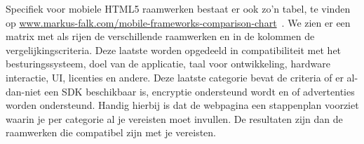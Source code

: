 Specifiek voor mobiele HTML5 raamwerken bestaat er ook zo'n tabel,  te vinden op \url{www.markus-falk.com/mobile-frameworks-comparison-chart}~\cite{Falk2011}.  We zien er een matrix met als rijen de verschillende raamwerken en in de kolommen de vergelijkingscriteria.  Deze laatste worden opgedeeld in compatibiliteit met het besturingssysteem,  doel van de applicatie,  taal voor ontwikkeling,  hardware interactie,  UI,  licenties en andere.  Deze laatste categorie bevat de criteria of er al-dan-niet een SDK beschikbaar is, encryptie ondersteund wordt en of advertenties worden ondersteund.  Handig hierbij is dat de webpagina een stappenplan voorziet waarin je per categorie al je vereisten moet invullen.  De resultaten zijn dan de raamwerken die compatibel zijn met je vereisten.

